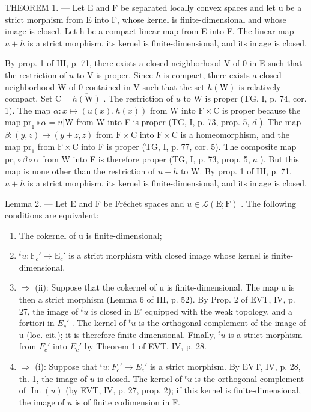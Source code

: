 THEOREM 1. --- Let E and F be separated locally convex spaces and let u be a strict morphism from E into F, whose kernel is finite-dimensional and whose image is closed. Let h be a compact linear map from E into F. The linear map \(u + h\) is a strict morphism, its kernel is finite-dimensional, and its image is closed.

By prop. 1 of III, p. 71, there exists a closed neighborhood V of 0 in E such that the restriction of \(u\) to V is proper. Since \(h\) is compact, there exists a closed neighborhood W of 0 contained in V such that the set \(h(\mathrm{W})\) is relatively compact. Set \(\mathrm{C} = \overline{h(\mathrm{W})}\) . The restriction of \(u\) to W is proper (TG, I, p. 74, cor. 1). The map \(\alpha: x \mapsto (u(x), h(x))\) from W into \(\mathrm{F} \times \mathrm{C}\) is proper because the map \(\mathrm{pr}_1 \circ \alpha = u|\mathrm{W}\) from W into F is proper (TG, I, p. 73, prop. 5, \(d\) ). The map \(\beta: (y, z) \mapsto (y + z, z)\) from \(\mathrm{F} \times \mathrm{C}\) into \(\mathrm{F} \times \mathrm{C}\) is a homeomorphism, and the map \(\mathrm{pr}_1\) from \(\mathrm{F} \times \mathrm{C}\) into F is proper (TG, I, p. 77, cor. 5). The composite map \(\mathrm{pr}_1 \circ \beta \circ \alpha\) from W into F is therefore proper (TG, I, p. 73, prop. 5, \(a\) ). But this map is none other than the restriction of \(u + h\) to W. By prop. 1 of III, p. 71, \(u + h\) is a strict morphism, its kernel is finite-dimensional, and its image is closed.

Lemma 2. --- Let E and F be Fréchet spaces and \(u \in \mathcal{L}(\mathrm{E};\mathrm{F})\) . The following conditions are equivalent:

\begin{enumerate}
\def\labelenumi{(\roman{enumi})}
\item
  The cokernel of u is finite-dimensional;
\item
  \(^{t}u \colon \mathrm{F}_c' \to \mathrm{E}_c'\) is a strict morphism with closed image whose kernel is finite-dimensional.
\item
  \(\Longrightarrow\) (ii): Suppose that the cokernel of u is finite-dimensional. The map u is then a strict morphism (Lemma 6 of III, p. 52). By Prop. 2 of EVT, IV, p. 27, the image of \(^{t}u\) is closed in E' equipped with the weak topology, and a fortiori in \(E_{c}'\) . The kernel of \(^{t}u\) is the orthogonal complement of the image of u (loc. cit.); it is therefore finite-dimensional. Finally, \(^{t}u\) is a strict morphism from \(F_{c}'\) into \(E_{c}'\) by Theorem 1 of EVT, IV, p. 28.
\item
  \(\Longrightarrow\) (i): Suppose that \(^t u\colon F_c' \to E_c'\) is a strict morphism. By EVT, IV, p. 28, th. 1, the image of \(u\) is closed. The kernel of \(^t u\) is the orthogonal complement of \(\operatorname{Im}(u)\) (by EVT, IV, p. 27, prop. 2); if this kernel is finite-dimensional, the image of \(u\) is of finite codimension in F.
\end{enumerate}

